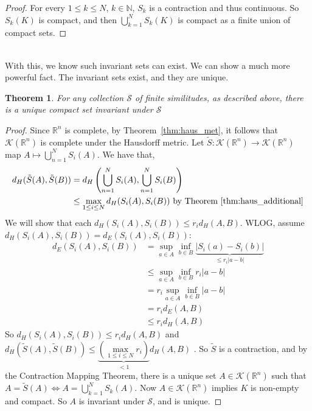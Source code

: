 \documentclass{article}
\theoremstyle{plain}
\newtheorem{thm}{Theorem}[section]
\theoremstyle{definition}
\theoremstyle{remark}
\begin{document}
\begin{proof}
    For every $1 \le k\le N$, $k \in \mathbb{N}$, $S_k$ is a contraction and thus continuous. So $S_k(K)$ is compact, and then $\bigcup \limits _{k=1}^N S_k(K)$ is compact as a finite union of compact sets. 
\end{proof}
~\\With this, we know such invariant sets can exist. We can show a much more powerful fact. The invariant sets exist, and they are unique.
\begin{thm}
    For any collection $\mathcal{S}$ of finite similitudes, as described above, there is a unique compact set invariant under $\mathcal{S}$
\end{thm}
\begin{proof}
    Since $\mathbb{R}^n$ is complete, by Theorem~\ref{thm:haus_met}, it follows that $\mathcal{K}(\mathbb{R}^n)$ is complete under the Hausdorff metric. Let $\tilde{S} : \mathcal{K}(\mathbb{R}^n) \to \mathcal{K}(\mathbb{R}^n)$ map $A \mapsto \bigcup \limits _{n=1}^N S_i(A)$. We have that, 
    \begin{align*}
        d_H(\tilde{S}(A), \tilde{S}(B)) & = d_H \left (\bigcup \limits _{n=1}^N S_i(A), \bigcup \limits _{n=1}^N S_i(B) \right ) \\ &  \le \max \limits _{1 \le i\le N}d_H(S_i(A), S_i(B)) \text{ by Theorem} ~\ref{thm:haus_additional}
    \end{align*}
We will show that each $d_H(S_i(A), S_i(B)) \le r_i d_H(A,B)$. WLOG, assume $d_H(S_i(A), S_i(B)) = d_E(S_i(A), S_i(B))$:
\begin{align*}
    d_E(S_i(A), S_i(B)) & = \sup \limits _{a\in A} \inf \limits _{b \in B}\underbrace{|S_i(a) -  S_i(b)| }_{\le r_i |a-b|} \\ & \le \sup \limits _{a\in A} \inf \limits _{b\in B} r_i |a-b|
    \\ & = r_i\sup \limits _{a\in A} \inf \limits _{b\in B} |a-b| \\ & = r_i d_E(A,B) \\ & \le r_i d_H(A,B)
\end{align*}
         So $d_H(S_i(A), S_i(B)) \le r_id_H(A,B) $ and $d_H(\tilde{S}(A), \tilde{S}(B)) \le \underbrace{(\max \limits _{1\le i \le N}r_i)} _{<1} d_H(A,B)$ .
    So $\tilde{S}$ is a contraction, and by the Contraction Mapping Theorem, there is a unique set $A \in \mathcal{K}(\mathbb{R}^n)$ such that $A = \tilde{S}(A) \iff A = \bigcup \limits _{k=1}^N S_k(A)$. Now $A \in \mathcal{K}(\mathbb{R}^n)$ implies $K$ is non-empty and compact. So $A$ is invariant under $\mathcal{S}$, and is unique.
\end{proof}
\end{document}
